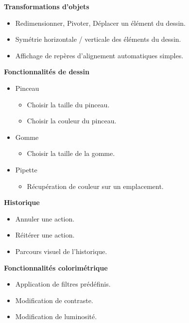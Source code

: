 \documentclass[11pt, a4paper, french]{article}
\begin{document}
			\textbf{Transformations d'objets}
			\begin{itemize}[label=\textbullet]
				\item Redimensionner, Pivoter, Déplacer un élément du dessin.
				\item Symétrie horizontale / verticale des éléments du dessin.
				\item Affichage de repères d'alignement automatiques simples.\\
			\end{itemize}
		
			\textbf{Fonctionnalités de dessin}
			\begin{itemize}[label=\textbullet]
				\item Pinceau
					\begin{itemize}[label=\textbullet]
						\item Choisir la taille du pinceau.
						\item Choisir la couleur du pinceau.
					\end{itemize}
				\item Gomme
					\begin{itemize}[label=\textbullet]
						\item Choisir la taille de la gomme.
					\end{itemize}
				\item Pipette
					\begin{itemize}[label=\textbullet]
						\item Récupération de couleur sur un emplacement. \\
					\end{itemize}
			\end{itemize}
		
			\textbf{Historique}
			\begin{itemize}[label=\textbullet]
				\item Annuler une action.
				\item Réitérer une action.
				\item Parcours visuel de l'historique. \\
			\end{itemize}
		
			\textbf{Fonctionnalités colorimétrique}
			\begin{itemize}[label=\textbullet]
				\item Application de filtres prédéfinis.
				\item Modification de contraste.
				\item Modification de luminosité.
			\end{itemize}
	
\end{document}

